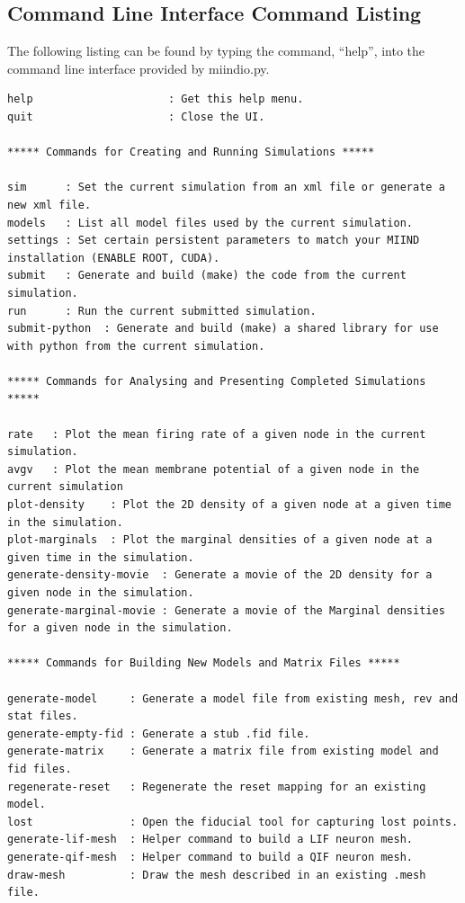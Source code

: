 \documentclass[utf8]{frontiers_suppmat} %
\begin{document}
\subsection{Command Line Interface Command Listing}
\label{clilisting}

The following listing can be found by typing the command, ``help'', into the command line interface provided by miindio.py.

\begin{lstlisting}
help                     : Get this help menu.
quit                     : Close the UI.

***** Commands for Creating and Running Simulations *****

sim      : Set the current simulation from an xml file or generate a new xml file.
models   : List all model files used by the current simulation.
settings : Set certain persistent parameters to match your MIIND installation (ENABLE ROOT, CUDA).
submit   : Generate and build (make) the code from the current simulation.
run      : Run the current submitted simulation.
submit-python  : Generate and build (make) a shared library for use with python from the current simulation.

***** Commands for Analysing and Presenting Completed Simulations *****

rate   : Plot the mean firing rate of a given node in the current simulation.
avgv   : Plot the mean membrane potential of a given node in the current simulation
plot-density    : Plot the 2D density of a given node at a given time in the simulation.
plot-marginals  : Plot the marginal densities of a given node at a given time in the simulation.
generate-density-movie  : Generate a movie of the 2D density for a given node in the simulation.
generate-marginal-movie : Generate a movie of the Marginal densities for a given node in the simulation.

***** Commands for Building New Models and Matrix Files *****

generate-model     : Generate a model file from existing mesh, rev and stat files.
generate-empty-fid : Generate a stub .fid file.
generate-matrix    : Generate a matrix file from existing model and fid files.
regenerate-reset   : Regenerate the reset mapping for an existing model.
lost               : Open the fiducial tool for capturing lost points.
generate-lif-mesh  : Helper command to build a LIF neuron mesh.
generate-qif-mesh  : Helper command to build a QIF neuron mesh.
draw-mesh          : Draw the mesh described in an existing .mesh file.
\end{lstlisting}
\end{document}
